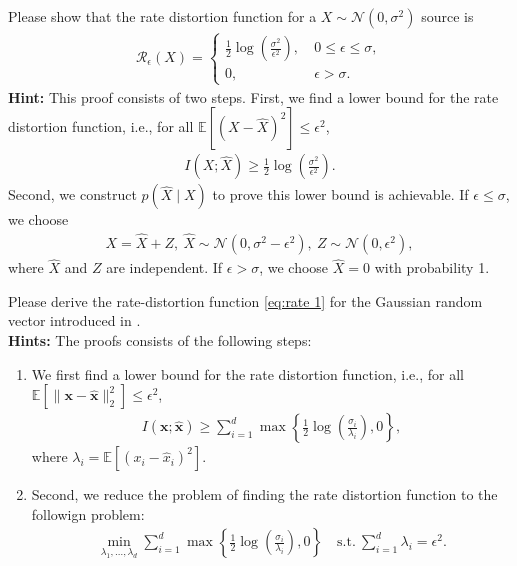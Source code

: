 \documentclass[../../book-main.tex]{subfiles}
\begin{document}
{\color{blue}
\begin{exercise}\label{ex:rate Gaussian}
    Please show that the rate distortion function for a $X \sim \mathcal{N}(0,\sigma^2)$ source is 
    \begin{align*}
        \mathcal{R}_{\epsilon}(X) = \begin{cases}
            \frac{1}{2}\log\left( \frac{\sigma^2}{\epsilon^2} \right),\ & 0 \le \epsilon \le \sigma,\\
            0,\ & \epsilon > \sigma. 
        \end{cases}
    \end{align*}
{\bf Hint:}  This proof consists of two steps. First, we find a lower bound for the rate distortion function, i.e., for all $\mathbb{E}[(X-\hat{X})^2] \le \epsilon^2$, 
\begin{align*}
    I(X;\hat{X}) \ge  \frac{1}{2}\log\left( \frac{\sigma^2}{\epsilon^2} \right). 
\end{align*}
Second, we construct $p(\hat{X} \mid X)$ to prove this lower bound is achievable. If $\epsilon \le \sigma$, we choose
\begin{align*}
    X = \hat{X} + Z,\ \hat{X} \sim \mathcal{N}(0,\sigma^2 - \epsilon^2),\ Z \sim \mathcal{N}(0,\epsilon^2), 
\end{align*}
where $\hat{X}$ and $Z$ are independent. If $\epsilon > \sigma$, we choose $\hat{X} = 0$ with probability 1. 
\end{exercise}


\begin{exercise}\label{exer:KKT}
    Please derive the rate-distortion function \eqref{eq:rate 1} for the Gaussian random vector introduced in . \\
\textbf{Hints:} The proofs consists of the following steps:
\begin{enumerate}
    \item We first find a lower bound for the rate distortion function, i.e., for all $\mathbb{E}[\|\bm{x}-\hat{\bm x}\|_2^2] \le \epsilon^2$,
    \begin{align}
        I(\bm x; \hat{\bm x}) \ge \sum_{i=1}^d \max\left\{\frac{1}{2}\log\left( \frac{\sigma_i}{\lambda_i} \right), 0\right\},
    \end{align}
    where $\lambda_i = \mathbb{E}[(x_i - \hat{x}_i)^2]$.

    \item Second, we reduce the problem of finding the rate distortion function to the followign problem:
    \begin{align}
        \min_{\lambda_1,\dots,\lambda_d}  \sum_{i=1}^d \max\left\{\frac{1}{2}\log\left( \frac{\sigma_i}{\lambda_i} \right), 0 \right\}\quad \mathrm{s.t.}\ \sum_{i=1}^d \lambda_i = \epsilon^2. 
    \end{align}
    

\end{enumerate}
\end{exercise}}
\end{document}
